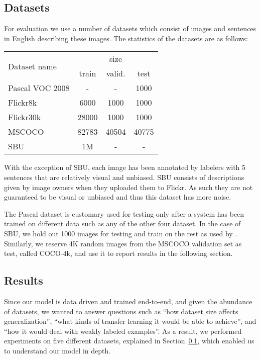 \subsection{Datasets}
\label{sec:data}
For evaluation we use a number of datasets which consist of images and sentences in English describing these
images. The statistics of the datasets are as follows:
\begin{center}
\begin{tabular}{|l|c|c|c|}
\hline
\multirow{2}{*}{Dataset name} & \multicolumn{3}{|c|}{size} \\
\cline{2-4}
 & train & valid. & test \\
\hline
\hline
Pascal VOC 2008 \cite{farhadi2010every} & - & - & 1000 \\
\hline
Flickr8k \cite{rashtchian2010collecting} & 6000 & 1000 & 1000 \\
\hline
Flickr30k \cite{hodoshimage} & 28000 & 1000 & 1000 \\
\hline
MSCOCO \cite{lin2014microsoft} & 82783 & 40504 & 40775 \\
\hline
SBU \cite{ordonez2011im2text} & 1M & - & - \\
\hline
\end{tabular}
\end{center}
With the exception of SBU, each image has been annotated by labelers
with 5 sentences that are
relatively visual and unbiased. SBU consists of
descriptions given by image owners when they uploaded them to Flickr. As 
such they are not guaranteed to be visual or unbiased and thus this dataset has more noise.

The Pascal dataset is customary used for testing only after a system has been trained on 
different data such as any of the other four dataset. In the case of SBU, we hold
out 1000 images for testing and train on the rest as 
used by \cite{kuznetsova2014treetalk}. Similarly, we reserve 4K random images from the
MSCOCO validation set as test, called COCO-4k, and use it to report results in the following section.


\subsection{Results}
\label{sec:results}

Since our model is data driven and trained end-to-end, and given the abundance of
datasets, we wanted to answer
questions such as ``how dataset size affects generalization'',
``what kinds of transfer learning it would be able to achieve'',
and ``how it would deal with weakly labeled examples''.
As a result, we performed experiments on five different datasets,
explained in Section~\ref{sec:data}, which enabled us to understand
our model in depth.

